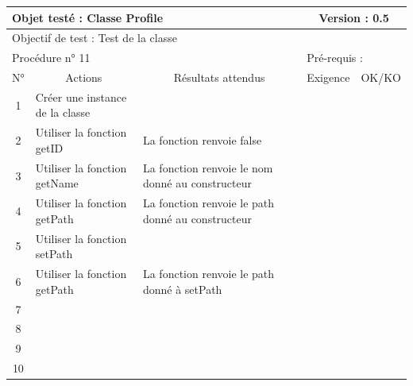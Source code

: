 \documentclass{../res/univ-projet}
\begin{document}
\begin{center}
    
    \begin{tabular}{|c|p{5cm}|p{5cm}|p{1.5cm}|p{1.5cm}|}
      \hline
      \multicolumn{3}{|l|}{Objet testé : Classe Profile} & \multicolumn{2}{c|}{Version : 0.5}\\ \hline
      \multicolumn{5}{|l|}{Objectif de test : Test de la classe}\\ \hline
      \multicolumn{3}{|l|}{Procédure n° 11} & \multicolumn{2}{p{3cm}|}{Pré-requis : }\\ \hline
      \multicolumn{1}{|c|}{N°} & \multicolumn{1}{c|}{Actions} & \multicolumn{1}{c|}{Résultats attendus} & 
      \multicolumn{1}{c|}{Exigence} & \multicolumn{1}{c|}{OK/KO}\\ \hline
      1 & Créer une instance de la classe &  &  & \\
      2 & Utiliser la fonction getID & La fonction renvoie false &  & \\
      3 & Utiliser la fonction getName & La fonction renvoie le nom donné au constructeur &  & \\
      4 & Utiliser la fonction getPath & La fonction renvoie le path donné au constructeur &  & \\
      5 & Utiliser la fonction setPath &  &  & \\
      6 & Utiliser la fonction getPath & La fonction renvoie le path donné à setPath &  & \\
      7 &  &  &  & \\
      8 &  &  &  & \\
      9 &  &  &  & \\
      10 &  &  &  &\\ 
    \hline
    \end{tabular}
    \vskip 2.2cm
	

\end{center}
\end{document}
